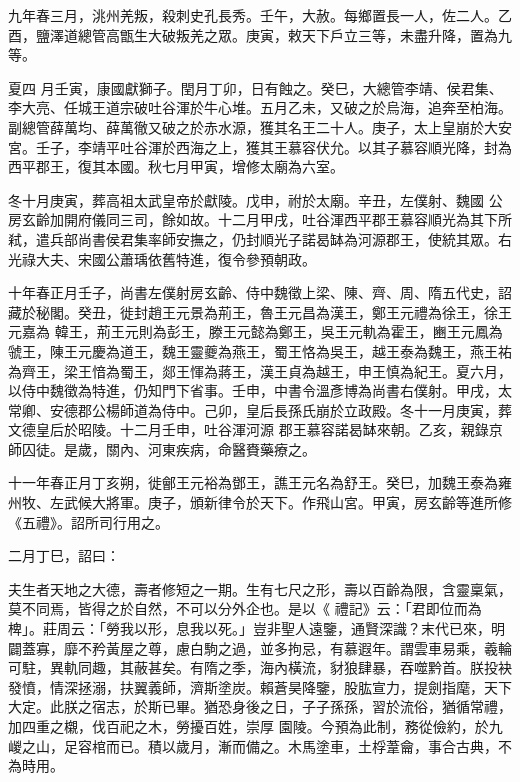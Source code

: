 \begin{pinyinscope}
 九年春三月，洮州羌叛，殺刺史孔長秀。壬午，大赦。每鄉置長一人，佐二人。乙酉，鹽澤道總管高甑生大破叛羌之眾。庚寅，敕天下戶立三等，未盡升降，置為九等。



 夏四
 月壬寅，康國獻獅子。閏月丁卯，日有蝕之。癸巳，大總管李靖、侯君集、李大亮、任城王道宗破吐谷渾於牛心堆。五月乙未，又破之於烏海，追奔至柏海。副總管薛萬均、薛萬徹又破之於赤水源，獲其名王二十人。庚子，太上皇崩於大安宮。壬子，李靖平吐谷渾於西海之上，獲其王慕容伏允。以其子慕容順光降，封為西平郡王，復其本國。秋七月甲寅，增修太廟為六室。



 冬十月庚寅，葬高祖太武皇帝於獻陵。戊申，祔於太廟。辛丑，左僕射、魏國
 公房玄齡加開府儀同三司，餘如故。十二月甲戌，吐谷渾西平郡王慕容順光為其下所弒，遣兵部尚書侯君集率師安撫之，仍封順光子諾曷缽為河源郡王，使統其眾。右光祿大夫、宋國公蕭瑀依舊特進，復令參預朝政。



 十年春正月壬子，尚書左僕射房玄齡、侍中魏徵上梁、陳、齊、周、隋五代史，詔藏於秘閣。癸丑，徙封趙王元景為荊王，魯王元昌為漢王，鄭王元禮為徐王，徐王元嘉為
 韓王，荊王元則為彭王，滕王元懿為鄭王，吳王元軌為霍王，豳王元鳳為虢王，陳王元慶為道王，魏王靈夔為燕王，蜀王恪為吳王，越王泰為魏王，燕王祐為齊王，梁王愔為蜀王，郯王惲為蔣王，漢王貞為越王，申王慎為紀王。夏六月，以侍中魏徵為特進，仍知門下省事。壬申，中書令溫彥博為尚書右僕射。甲戌，太常卿、安德郡公楊師道為侍中。己卯，皇后長孫氏崩於立政殿。冬十一月庚寅，葬文德皇后於昭陵。十二月壬申，吐谷渾河源
 郡王慕容諾曷缽來朝。乙亥，親錄京師囚徒。是歲，關內、河東疾病，命醫賚藥療之。



 十一年春正月丁亥朔，徙鄶王元裕為鄧王，譙王元名為舒王。癸巳，加魏王泰為雍州牧、左武候大將軍。庚子，頒新律令於天下。作飛山宮。甲寅，房玄齡等進所修《五禮》。詔所司行用之。



 二月丁巳，詔曰：



 夫生者天地之大德，壽者修短之一期。生有七尺之形，壽以百齡為限，含靈稟氣，莫不同焉，皆得之於自然，不可以分外企也。是以《
 禮記》云：「君即位而為椑」。莊周云：「勞我以形，息我以死。」豈非聖人遠鑒，通賢深識？末代已來，明闢蓋寡，靡不矜黃屋之尊，慮白駒之過，並多拘忌，有慕遐年。謂雲車易乘，羲輪可駐，異軌同趣，其蔽甚矣。有隋之季，海內橫流，豺狼肆暴，吞噬黔首。朕投袂發憤，情深拯溺，扶翼義師，濟斯塗炭。賴蒼昊降鑒，股肱宣力，提劍指麾，天下大定。此朕之宿志，於斯已畢。猶恐身後之日，子子孫孫，習於流俗，猶循常禮，加四重之櫬，伐百祀之木，勞擾百姓，崇厚
 園陵。今預為此制，務從儉約，於九嵕之山，足容棺而已。積以歲月，漸而備之。木馬塗車，土桴葦龠，事合古典，不為時用。




\end{pinyinscope}
